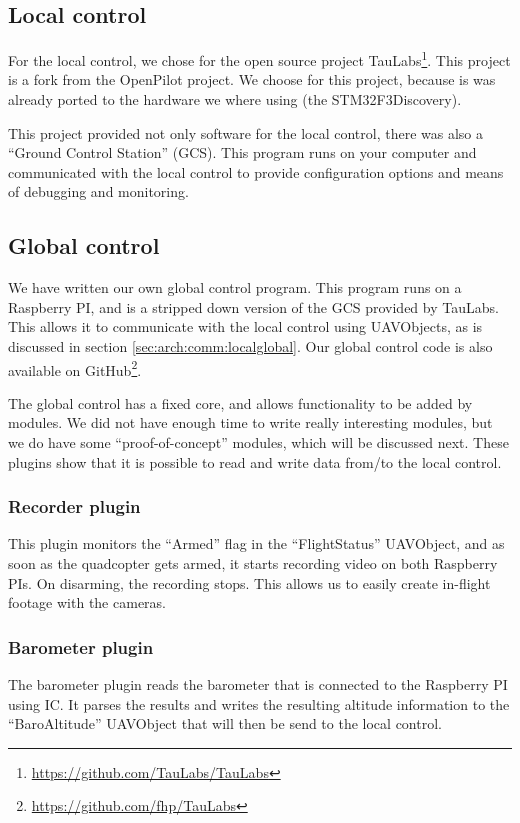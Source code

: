 \documentclass[11pt, a4paper, onecolumn, oneside, parskip=half]{scrartcl}
\begin{document}
\subsection{Local control}
\label{sec:software:local}
For the local control, we chose for the open source project TauLabs\footnote{\url{https://github.com/TauLabs/TauLabs}}. This project is a fork from the OpenPilot project. We choose for this project, because is was already ported to the hardware we where using (the STM32F3Discovery).

This project provided not only software for the local control, there was also a ``Ground Control Station'' (GCS). This program runs on your computer and communicated with the local control to provide configuration options and means of debugging and monitoring.

\subsection{Global control}
\label{sec:software:global}
We have written our own global control program. This program runs on a Raspberry PI, and is a stripped down version of the GCS provided by TauLabs. This allows it to communicate with the local control using UAVObjects, as is discussed in section \ref{sec:arch:comm:localglobal}. Our global control code is also available on GitHub\footnote{\url{https://github.com/fhp/TauLabs}}.

The global control has a fixed core, and allows functionality to be added by modules. We did not have enough time to write really interesting modules, but we do have some ``proof-of-concept'' modules, which will be discussed next. These plugins show that it is possible to read and write data from/to the local control.

\subsubsection{Recorder plugin}
\label{sec:software:global:recorder}
This plugin monitors the ``Armed'' flag in the ``FlightStatus'' UAVObject, and as soon as the quadcopter gets armed, it starts recording video on both Raspberry PIs. On disarming, the recording stops. This allows us to easily create in-flight footage with the cameras.

\subsubsection{Barometer plugin}
\label{sec:software:global:barometer}
The barometer plugin reads the barometer that is connected to the Raspberry PI using I\texttwosuperior C. It parses the results and writes the resulting altitude information to the ``BaroAltitude'' UAVObject that will then be send to the local control.
\end{document}
